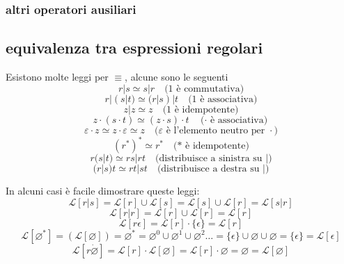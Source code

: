 \subsubsection{altri operatori ausiliari}
\dfn{}{}

\subsection{equivalenza tra espressioni regolari}

Esistono molte leggi per $\equiv$, alcune sono le seguenti 
\[
r | s \simeq s | r \quad \text{(1 è commutativa)}
\]
\[
r | (s | t) \simeq (r | s) | t \quad \text{(1 è associativa)}
\]
\[
z | z \simeq z \quad \text{(1 è idempotente)}
\]
\[
z \cdot (s \cdot t) \simeq (z \cdot s) \cdot t \quad \text{($\cdot$ è associativa)}
\]
\[
\varepsilon \cdot z \simeq z \cdot \varepsilon \simeq z \quad \text{($\varepsilon$ è l'elemento neutro per $\cdot$)}
\]
\[
(r^*)^* \simeq r^* \quad \text{(* è idempotente)}
\]
\[
r (s | t) \simeq r s | r t \quad \text{(distribuisce a sinistra su |)}
\]
\[
(r | s) t \simeq r t | s t \quad \text{(distribuisce a destra su |)}
\]

In alcuni casi è facile dimostrare queste leggi:
\[
    \mathcal{L}[r|s] =\mathcal{L}[r]\cup\mathcal{L}[s]=\mathcal{L}[s]\cup\mathcal{L}[r] = \mathcal{L}[s|r]    
\]
\[
    \mathcal{L}[r|r]=\mathcal{L}[r]\cup \mathcal{L}[r]=\mathcal{L}[r]
\]
\[
    \mathcal{L}[r\epsilon] = \mathcal{L}[r]\cdot\{\epsilon\}=\mathcal{L}[r]
\]
\[
    \mathcal{L}[\varnothing^*] = (\mathcal{L}[\varnothing]) = \varnothing^*=\varnothing^0\cup\varnothing^1\cup\varnothing^2\dots=\{\epsilon\}\cup\varnothing\cup \varnothing=\{\epsilon\}=\mathcal{L}[\epsilon]    
\]
\[
    \mathcal{L}[r\dot \varnothing]=\mathcal{L}[r]\cdot\mathcal{L}[\varnothing]=\mathcal{L}[r]\cdot\varnothing=\varnothing=\mathcal{L}[\varnothing]    
\]

